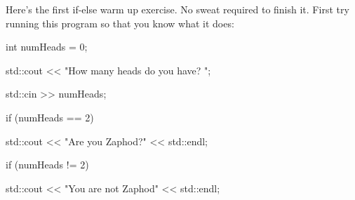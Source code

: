 Here's the first if-else warm up exercise. No sweat required to finish it. First try running this program so that you know what it does:

\begin{console}

int numHeads = 0;

std::cout << "How many heads do you have? ";

std::cin >> numHeads;

if (numHeads == 2)

   std::cout << "Are you Zaphod?" << std::endl;

if (numHeads != 2)

   std::cout << "You are not Zaphod" << std::endl;

\end{console}


